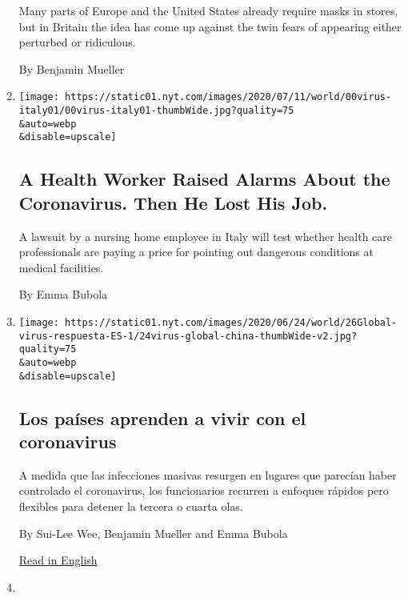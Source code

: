 \begin{enumerate}
  Many parts of Europe and the United States already require masks in
  stores, but in Britain the idea has come up against the twin fears of
  appearing either perturbed or ridiculous.

  By Benjamin Mueller
\item
  \href{/2020/07/13/world/europe/italy-coronavirus-nursing-homes.html}{}

  \texttt{[image: https://static01.nyt.com/images/2020/07/11/world/00virus-italy01/00virus-italy01-thumbWide.jpg?quality=75\\\&auto=webp\\\&disable=upscale]}

  \hypertarget{a-health-worker-raised-alarms-about-the-coronavirus-then-he-lost-his-job}{%
  \subsection{A Health Worker Raised Alarms About the Coronavirus. Then
  He Lost His
  Job.}\label{a-health-worker-raised-alarms-about-the-coronavirus-then-he-lost-his-job}}

  A lawsuit by a nursing home employee in Italy will test whether health
  care professionals are paying a price for pointing out dangerous
  conditions at medical facilities.

  By Emma Bubola
\item
  \href{/es/2020/06/26/espanol/mundo/controlar-coronavirus-paises.html}{}

  \texttt{[image: https://static01.nyt.com/images/2020/06/24/world/26Global-virus-respuesta-ES-1/24virus-global-china-thumbWide-v2.jpg?quality=75\\\&auto=webp\\\&disable=upscale]}

  \hypertarget{los-pauxedses-aprenden-a-vivir-con-el-coronavirus}{%
  \subsection{Los países aprenden a vivir con el
  coronavirus}\label{los-pauxedses-aprenden-a-vivir-con-el-coronavirus}}

  A medida que las infecciones masivas resurgen en lugares que parecían
  haber controlado el coronavirus, los funcionarios recurren a enfoques
  rápidos pero flexibles para detener la tercera o cuarta olas.

  By Sui-Lee Wee, Benjamin Mueller and Emma Bubola

  \href{https://www.nytimes.com/2020/06/24/world/europe/countries-reopening-coronavirus.html}{Read
  in English}
\item
  \href{/2020/06/24/world/europe/countries-reopening-coronavirus.html}{}


\end{enumerate}
